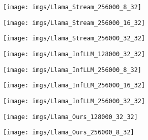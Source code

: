 \begin{figure*}[ht]
\begin{minipage}{\textwidth}
\begin{minipage}{0.24\textwidth}
		\end{minipage}%
		\begin{minipage}{0.24\textwidth}
			\centering
			\texttt{[image: imgs/Llama\_Stream\_256000\_8\_32]} %
		\end{minipage}%
		\begin{minipage}{0.24\textwidth}
			\centering
			\texttt{[image: imgs/Llama\_Stream\_256000\_16\_32]} %
		\end{minipage}%
		\begin{minipage}{0.24\textwidth}
			\centering
			\texttt{[image: imgs/Llama\_Stream\_256000\_32\_32]} %
		\end{minipage}
	\end{minipage}
	\begin{minipage}{\textwidth}
		\centering
		\begin{minipage}{0.24\textwidth}
			\centering
			\texttt{[image: imgs/Llama\_InfLLM\_128000\_32\_32]} %
		\end{minipage}%
		\begin{minipage}{0.24\textwidth}
			\centering
			\texttt{[image: imgs/Llama\_InfLLM\_256000\_8\_32]} %
		\end{minipage}%
		\begin{minipage}{0.24\textwidth}
			\centering
			\texttt{[image: imgs/Llama\_InfLLM\_256000\_16\_32]} %
		\end{minipage}%
		\begin{minipage}{0.24\textwidth}
			\centering
			\texttt{[image: imgs/Llama\_InfLLM\_256000\_32\_32]} %
		\end{minipage}
	\end{minipage}
	\begin{minipage}{\textwidth}
		\centering
		\begin{minipage}{0.24\textwidth}
			\centering
			\texttt{[image: imgs/Llama\_Ours\_128000\_32\_32]} %
		\end{minipage}%
		\begin{minipage}{0.24\textwidth}
			\centering
			\texttt{[image: imgs/Llama\_Ours\_256000\_8\_32]} %

\end{minipage}
\end{minipage}
\end{figure*}
